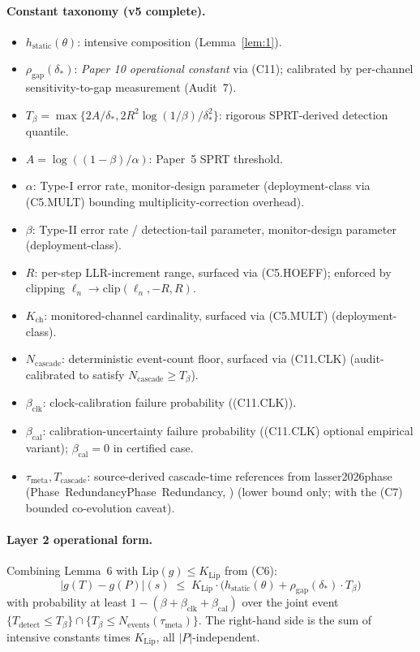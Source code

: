 \documentclass{article}
\makeatletter
\newcommand{\citep}[2][]{%
  \begingroup
  \def\@tmpkey{#2}%
  \ifx\@tmpkey\@empty\else
    (\ifx\@empty#1\@empty\else #1, \fi
     \@nameuse{bibkey@\@tmpkey})%
  \fi
  \endgroup
}
\newcommand{\deltastar}{\delta_{*}}
\newcommand{\rhogap}{\rho_{\mathrm{gap}}}
\newcommand{\Pproxy}{P}
\newcommand{\Ttruth}{T}
\newcommand{\Tbeta}{T_{\beta}}
\newcommand{\Ncasc}{N_{\mathrm{cascade}}}
\newcommand{\Nev}{N_{\mathrm{events}}}
\newcommand{\bclk}{\beta_{\mathrm{clk}}}
\newcommand{\bcal}{\beta_{\mathrm{cal}}}
\makeatother
\begin{document}
\paragraph{Constant taxonomy (v5 complete).}
\begin{itemize}
\item $h_{\mathrm{static}}(\theta)$: intensive composition
  (Lemma~\ref{lem:1}).
\item $\rhogap(\deltastar)$: \emph{Paper 10 operational constant}
  via (C11); calibrated by per-channel sensitivity-to-gap
  measurement (Audit~7).
\item $\Tbeta = \max\{2A/\deltastar, 2R^2\log(1/\beta)/\deltastar^2\}$:
  rigorous SPRT-derived detection quantile.
\item $A = \log((1-\beta)/\alpha)$: Paper~5 SPRT threshold.
\item $\alpha$: Type-I error rate, monitor-design parameter
  (deployment-class via (C5.MULT) bounding multiplicity-correction
  overhead).
\item $\beta$: Type-II error rate / detection-tail parameter,
  monitor-design parameter (deployment-class).
\item $R$: per-step LLR-increment range, surfaced via (C5.HOEFF);
  enforced by clipping $\ell_n \to \mathrm{clip}(\ell_n, -R, R)$.
\item $K_{\mathrm{ch}}$: monitored-channel cardinality, surfaced via
  (C5.MULT) (deployment-class).
\item $\Ncasc$: deterministic event-count floor, surfaced via
  (C11.CLK) (audit-calibrated to satisfy $\Ncasc \geq \Tbeta$).
\item $\bclk$: clock-calibration failure probability ((C11.CLK)).
\item $\bcal$: calibration-uncertainty failure probability
  ((C11.CLK) optional empirical variant); $\bcal = 0$ in certified
  case.
\item $\tau_{\mathrm{meta}}, T_{\mathrm{cascade}}$: source-derived
  cascade-time references from
  \citep[Phase~Redundancy]{lasser2026phase} (lower bound only;
  with the (C7) bounded co-evolution caveat).
\end{itemize}

\paragraph{Layer 2 operational form.}
Combining Lemma~6 with $\mathrm{Lip}(g) \leq K_{\mathrm{Lip}}$ from
(C6):
\[
  |g(\Ttruth) - g(\Pproxy)|(s) \;\leq\; K_{\mathrm{Lip}} \cdot
  \bigl(h_{\mathrm{static}}(\theta) + \rhogap(\deltastar) \cdot
  \Tbeta\bigr)
\]
with probability at least $1 - (\beta + \bclk + \bcal)$ over the
joint event $\{T_{\mathrm{detect}} \leq \Tbeta\} \cap \{\Tbeta \leq
\Nev(\tau_{\mathrm{meta}})\}$.  The right-hand side is the sum of
intensive constants times $K_{\mathrm{Lip}}$, all $|P|$-independent.
\end{document}

